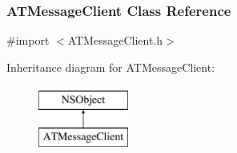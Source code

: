 \hypertarget{interface_a_t_message_client}{
\subsubsection{ATMessageClient Class Reference}
\label{interface_a_t_message_client}
}


{\ttfamily \#import $<$ATMessageClient.h$>$}

Inheritance diagram for ATMessageClient:\begin{figure}[h]
\begin{center}
\leavevmode
\includegraphics[height=2.000000cm]{interface_a_t_message_client}
\end{center}
\end{figure}
